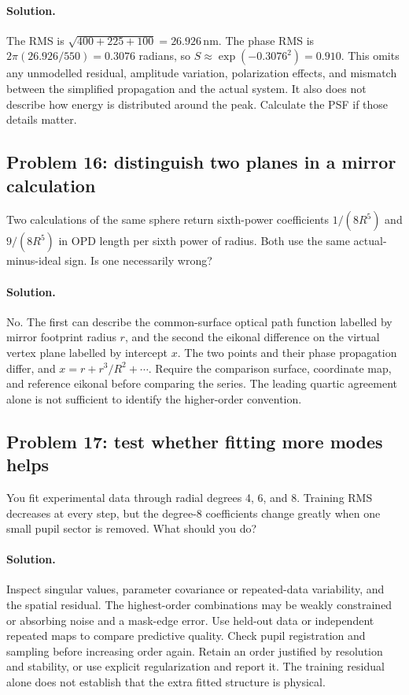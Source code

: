 \paragraph{Solution.}
The RMS is $\sqrt{400+225+100}=26.926\,\mathrm{nm}$.
The phase RMS is $2\pi(26.926/550)=0.3076$ radians, so
$S\approx\exp(-0.3076^2)=0.910$.
This omits any unmodelled residual, amplitude variation, polarization
effects, and mismatch between the simplified propagation and the
actual system. It also does not describe how energy is distributed
around the peak. Calculate the PSF if those details matter.

\subsection*{Problem 16: distinguish two planes in a mirror calculation}
Two calculations of the same sphere return sixth-power coefficients
$1/(8R^5)$ and $9/(8R^5)$ in OPD length per sixth power of radius.
Both use the same actual-minus-ideal sign. Is one necessarily wrong?

\paragraph{Solution.}
No. The first can describe the common-surface optical path function
labelled by mirror footprint radius $r$, and the second the eikonal
difference on the virtual vertex plane labelled by intercept $x$.
The two points and their phase propagation differ, and
$x=r+r^3/R^2+\cdots$. Require the comparison surface, coordinate map,
and reference eikonal before comparing the series. The leading quartic
agreement alone is not sufficient to identify the higher-order
convention.

\subsection*{Problem 17: test whether fitting more modes helps}
You fit experimental data through radial degrees 4, 6, and 8. Training
RMS decreases at every step, but the degree-8 coefficients change
greatly when one small pupil sector is removed. What should you do?

\paragraph{Solution.}
Inspect singular values, parameter covariance or repeated-data
variability, and the spatial residual. The highest-order combinations
may be weakly constrained or absorbing noise and a mask-edge error.
Use held-out data or independent repeated maps to compare predictive
quality. Check pupil registration and sampling before increasing order
again. Retain an order justified by resolution and stability, or use
explicit regularization and report it. The training residual alone
does not establish that the extra fitted structure is physical.

